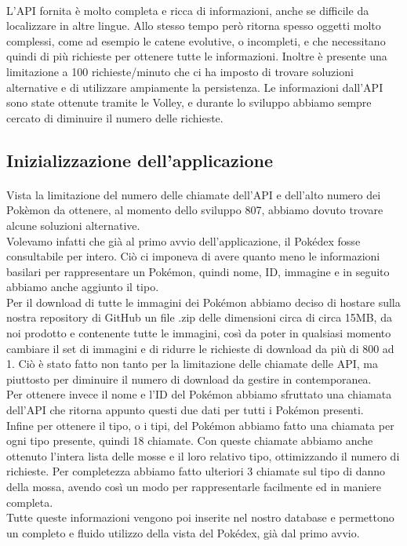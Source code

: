 \documentclass[a4paper,11pt]{article}
\begin{document}
  					\paragraph{}
  						L’API fornita è molto completa e ricca di informazioni, anche se difficile da localizzare in altre lingue. Allo stesso tempo però ritorna spesso oggetti molto complessi, come ad esempio le catene evolutive, o incompleti, e che necessitano quindi di più richieste per ottenere tutte le informazioni. Inoltre è presente una limitazione a 100 richieste/minuto che ci ha imposto di trovare soluzioni alternative e di utilizzare ampiamente la persistenza. Le informazioni dall’API sono state ottenute tramite le Volley, e durante lo sviluppo abbiamo sempre cercato di diminuire il numero delle richieste.
  				\subsection{Inizializzazione dell'applicazione}
  					\paragraph{}
  						Vista la limitazione del numero delle chiamate dell’API e dell’alto numero dei Pokèmon da ottenere, al momento dello sviluppo 807, abbiamo dovuto trovare alcune soluzioni alternative.\\
  						Volevamo infatti che già al primo avvio dell’applicazione, il Pokédex fosse consultabile per intero. Ciò ci imponeva di avere quanto meno le informazioni basilari per rappresentare un Pokémon, quindi nome, ID, immagine e in seguito abbiamo anche aggiunto il tipo.\\
  						Per il download di tutte le immagini dei Pokémon abbiamo deciso di hostare sulla nostra repository di GitHub un file .zip delle dimensioni circa di circa 15MB, da noi prodotto e contenente tutte le immagini, così da poter in qualsiasi momento cambiare il set di immagini e di ridurre le richieste di download da più di 800 ad 1. Ciò è stato fatto non tanto per la limitazione delle chiamate delle API, ma piuttosto per diminuire il numero di download da gestire in contemporanea.\\
  						Per ottenere invece il nome e l’ID del Pokémon abbiamo sfruttato una chiamata dell’API che ritorna appunto questi due dati per tutti i Pokémon presenti.\\
  						Infine per ottenere il tipo, o i tipi, del Pokémon abbiamo fatto una chiamata per ogni tipo presente, quindi 18 chiamate. Con queste chiamate abbiamo anche ottenuto l’intera lista delle mosse e il loro relativo tipo, ottimizzando il numero di richieste. Per completezza abbiamo fatto ulteriori 3 chiamate sul tipo di danno della mossa, avendo così un modo per rappresentarle facilmente ed in maniere completa.\\
  						Tutte queste informazioni vengono poi inserite nel nostro database e permettono un completo e fluido utilizzo della vista del Pokédex, già dal primo avvio.\\
\end{document}
